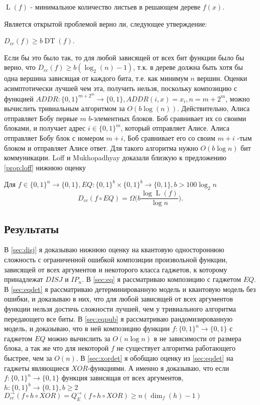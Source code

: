 \documentclass{article}
\begin{document}
\begin{definition}
    $\operatorname{L}(f)$ - минимальное количество листьев в решающем дереве $f(x)$.
\end{definition}
Является открытой проблемой верно ли, следующее утверждение:
\begin{proposition} 
    \label{prop:loff}
    $D_{cc}(f) \geq b\operatorname{DT}(f)$.
\end{proposition} Если бы это было так, то для любой зависящей от всех бит функции было бы верно, что $D_{cc}(f) \geq b(\log_2(n) - 1)$, т.к. в дереве должна быть хотя бы одна вершина зависящая от каждого бита, т.е. как минимум $n$ вершин. Оценки асимптотически лучшей чем эта, получить нельзя, поскольку композицию с функцией $ADDR: \{0, 1\}^{m + 2^m} \to \{0, 1\}, ADDR(i, x) = x_i, n = m + 2^m$, можно вычислить тривиальным алгоритмом за $O(b \log(n))$. Действительно, Алиса отправляет Бобу первые $m$ $b$-элементных блоков. Боб сравнивает их со своими блоками, и получает адрес $i \in \{0, 1\}^m$, который отправляет Алисе. Алиса отправляет Бобу блок с номером $m + i$, Боб сравнивает его со своим $m + i$ -тым блоком и отправляет Алисе ответ. Для такого алгоритма нужно $O(b \log n)$ бит коммуникации. Loff и Mukhopadhyay доказали близкую к предложению \ref{prop:loff} нижнюю оценку~\cite{loff}
\begin{theorem}
    Для $f \in \{0, 1\}^n \to \{0, 1\}, EQ: \{0, 1\}^b \times \{0, 1\}^b \to \{0, 1\}, b > 100 \log_2n$
    $$D_{cc}(f \circ EQ) = \Omega\bigg(b\frac{\log \operatorname{L}(f)}{\log n}\bigg).$$ 
\end{theorem}   

\subsection{Результаты}
    В \autoref{sec:disj} я доказываю нижнюю оценку на квантовую одностороннюю сложность с ограниченной ошибкой композиции произвольной функции, зависящей от всех аргументов и некоторого класса гаджетов, к которому принадлежат $DISJ$ и $IP_n$. В \autoref{sec:eq} я рассматриваю композицию с гаджетом $EQ$. В \autoref{sec:eqdet} я рассматриваю детерминированную модель и квантовую модель без ошибки, и доказываю в них, что для любой зависящей от всех аргументов функции нельзя достичь сложности лучшей, чем у тривиального алгоритма передающего все биты. В \autoref{sec:eqpub} я рассматриваю рандомизированную модель, и доказываю, что в ней композицию функции $f: \{0, 1\}^n \to \{0, 1\}$ с гаджетом $EQ$ можно вычислить за $O(n \log n)$ в не зависимости от размера блока, а так же что для некоторой $f$ не существует алгоритма работающего быстрее, чем за $O(n)$. В \autoref{sec:xordet} я обобщаю оценку из \autoref{sec:eqdet} на гаджеты являющиеся $XOR$-функциями. А именно я доказываю, что если $f: \{0, 1\}^n \to \{0, 1\}$ функция зависящая от всех аргументов, $h: \{0, 1\}^b \to \{0, 1\}, b \geq 2$ $D_{cc}^{\to}(f \circ h \circ XOR) = Q_{E}^{\to}(f \circ h \circ XOR) \geq n(\dim_f(h) - 1)$
\end{document}
